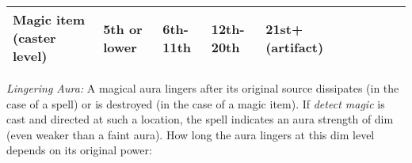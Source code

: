 \begin{longtable}{llllllllll}
{\begin{minipage}[t]{0.055in}
Magic item (caster level)\end{minipage}} & \multicolumn{1}{p{0.055in}|}{\begin{minipage}[t]{0.055in}\centering
5th or lower\end{minipage}} & \multicolumn{1}{|p{1.448in}|}{\begin{minipage}[t]{1.448in}\centering
6th-11th\end{minipage}} & \multicolumn{1}{p{0.668in}|}{\begin{minipage}[t]{0.668in}\centering
12th-20th\end{minipage}} & \multicolumn{1}{p{0.582in}|}{\begin{minipage}[t]{0.582in}\centering
21st+ (artifact)\end{minipage}}\\
\hline
\end{longtable}

\textit{Lingering Aura:} A magical aura lingers after its original source dissipates 
(in the case of a spell) or is destroyed (in the case of a magic item). If \textit{detect 
magic} is cast and directed at such a location, the spell indicates an aura strength 
of dim (even weaker than a faint aura). How long the aura lingers at this dim level 
depends on its original power:

